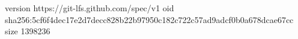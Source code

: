 version https://git-lfs.github.com/spec/v1
oid sha256:5cf6f4dec17e2d7decc828b22b97950c182c722c57ad9adcf0b0a678dcae67cc
size 1398236
